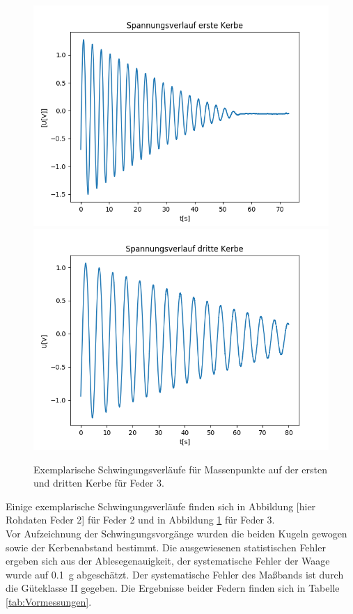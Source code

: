 \documentclass[12pt,a4paper]{article}
\begin{document}
\begin{figure}
\begin{center}
\includegraphics[scale=0.5]{Bilder/Feder3Kerbe1}
\includegraphics[scale=0.5]{Bilder/Feder3Kerbe3}
\end{center}
\caption{Exemplarische Schwingungsverläufe für Massenpunkte auf der ersten und dritten Kerbe für Feder 3.}
\label{fig:RohdatenFeder3}
\end{figure}


Einige exemplarische Schwingungsverläufe finden sich in Abbildung [hier Rohdaten Feder 2] für Feder 2 und in Abbildung \ref{fig:RohdatenFeder3} für Feder 3.\\

Vor Aufzeichnung der Schwingungsvorgänge wurden die beiden Kugeln gewogen sowie der Kerbenabstand bestimmt. Die ausgewiesenen statistischen Fehler ergeben sich aus der Ablesegenauigkeit, der systematische Fehler der Waage wurde auf \SI{0.1}{g} abgeschätzt. Der systematische Fehler des Maßbands ist durch die Güteklasse II gegeben. Die Ergebnisse beider Federn finden sich in Tabelle \ref{tab:Vormessungen}.\\
\end{document}
